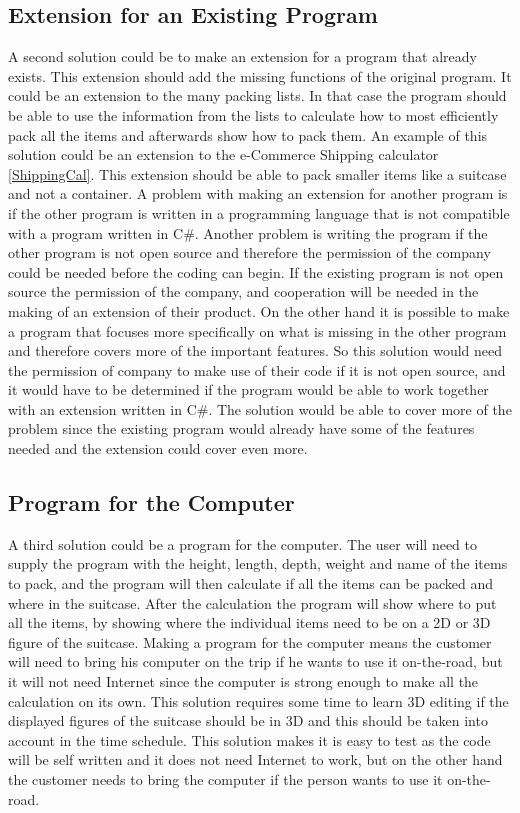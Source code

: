 \subsection{Extension for an Existing Program}
A second solution could be to make an extension for a program that already exists. This extension should add the missing functions of the original program. It could be an extension to the many packing lists. In that case the program should be able to use the information from the lists to calculate how to most efficiently pack all the items and afterwards show how to pack them. An example of this solution could be an extension to the e-Commerce Shipping calculator \ref{ShippingCal}. This extension should be able to pack smaller items like a suitcase and not a container. A problem with making an extension for another program is if the other program is written in a programming language that is not compatible with a program written in C\#. Another problem is writing the program if the other program is not open source and therefore the permission of the company could be needed before the coding can begin. If the existing program is not open source the permission of the company, and cooperation will be needed in the making of an extension of their product. On the other hand it is possible to make a program that focuses more specifically on what is missing in the other program and therefore covers more of the important features. So this solution would need the permission of company to make use of their code if it is not open source, and it would have to be determined if the program would be able to work together with an extension written in C\#. The solution would be able to cover more of the problem since the existing program would already have some of the features needed and the extension could cover even more.

\subsection{Program for the Computer}
A third solution could be a program for the computer. The user will need to supply the program with the height, length, depth, weight and name of the items to pack, and the program will then calculate if all the items can be packed and where in the suitcase. After the calculation the program will show where to put all the items, by showing where the individual items need to be on a 2D or 3D figure of the suitcase. Making a program for the computer means the customer will need to bring his computer on the trip if he wants to use it on-the-road, but it will not need Internet since the computer is strong enough to make all the calculation on its own. This solution requires some time to learn 3D editing if the displayed figures of the suitcase should be in 3D and this should be taken into account in the time schedule. This solution makes it is easy to test as the code will be self written and it does not need Internet to work, but on the other hand the customer needs to bring the computer if the person wants to use it on-the-road.


